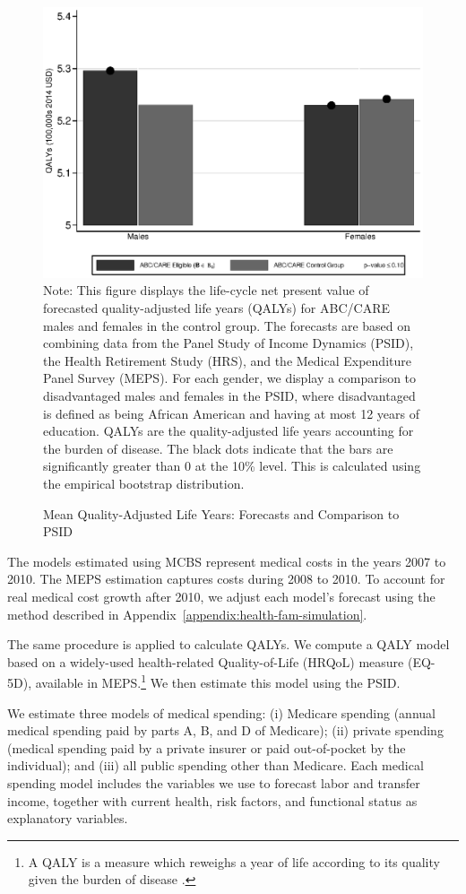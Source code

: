 \begin{figure}[!htbp]
\caption{Mean Quality-Adjusted Life Years: Forecasts and Comparison to PSID}\label{fig:qalys}
\centering
\includegraphics[width=.7\columnwidth]{output/qalyexppsid.eps}
\footnotesize \justify
Note:  This figure displays the life-cycle net present value of forecasted quality-adjusted life years (QALYs) for ABC/CARE males and females in the control group. The forecasts are based on combining data from the Panel Study of Income Dynamics (PSID), the Health Retirement Study (HRS), and the Medical Expenditure Panel Survey (MEPS). For each gender, we display a comparison to disadvantaged males and females in the PSID, where disadvantaged is defined as being African American and having at most 12 years of education. QALYs are the quality-adjusted life years accounting for the burden of disease. The black dots indicate that the bars are significantly greater than 0 at the 10\% level. This is calculated using the empirical bootstrap distribution.
\end{figure}

The models estimated using MCBS represent medical costs in the years 2007 to 2010. The MEPS estimation captures costs during 2008 to 2010. To account for real medical cost growth after 2010, we adjust each model's forecast using the method described in  Appendix~\ref{appendix:health-fam-simulation}.

The same procedure is applied to calculate QALYs. We compute a QALY model based on a widely-used health-related Quality-of-Life (HRQoL) measure (EQ-5D), available in MEPS.\footnote{A QALY is a measure which reweighs a year of life according to its quality given the burden of disease \citep{Dolan_1997_Modeling_MC,Shaw_etal_2005_EQ5D_MC}.} We then estimate this model using the PSID.

We estimate three models of medical spending: (i) Medicare spending (annual medical spending paid by parts A, B, and D of Medicare); (ii) private spending (medical spending paid by a private insurer or paid out-of-pocket by the individual); and (iii) all public spending other than Medicare. Each medical spending model includes the variables we use to forecast labor and transfer income, together with current health, risk factors, and functional status as explanatory variables.

